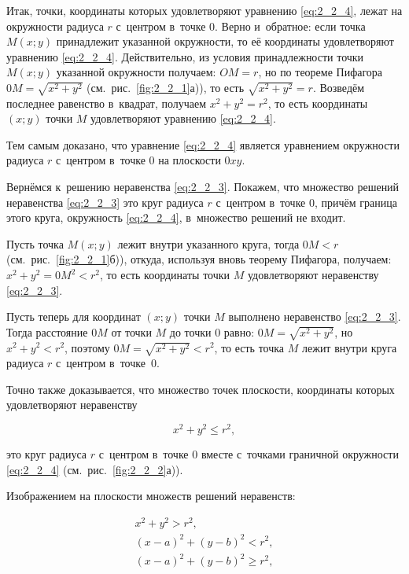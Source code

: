 Итак, точки, координаты которых удовлетворяют уравнению \eqref{eq:2_2_4},
лежат на окружности радиуса $r$ с~центром в~точке $0$.
Верно и~обратное: если точка $M(x; y)$ принадлежит указанной окружности,
то её координаты удовлетворяют уравнению \eqref{eq:2_2_4}.
Действительно, из условия принадлежности точки $M(x; y)$ указанной
окружности получаем: $OM = r$, но по теореме Пифагора
$0M = \sqrt{x^{2} + y^{2}}$ (см.\ рис.\ \ref{fig:2_2_1}а)), то есть
$\sqrt{x^{2} + y^{2}} = r$.
Возведём последнее равенство в~квадрат, получаем $x^{2} + y^{2} = r^{2}$,
то есть координаты $(x; y)$ точки $M$ удовлетворяют уравнению \eqref{eq:2_2_4}.

Тем самым доказано, что уравнение \eqref{eq:2_2_4} является уравнением окружности
радиуса $r$ с~центром в~точке 0 на плоскости $0xy$.

Вернёмся к~решению неравенства \eqref{eq:2_2_3}. Покажем, что множество решений
неравенства \eqref{eq:2_2_3} это круг радиуса $r$ с~центром в~точке $0$, причём
граница этого круга, окружность \eqref{eq:2_2_4}, в~множество решений не входит.

Пусть точка $M(x; y)$ лежит внутри указанного круга, тогда $0M < r$
(см.\ рис.\ \ref{fig:2_2_1}б)), откуда, используя вновь теорему Пифагора, получаем:
$x^{2} + y^{2} = 0M^{2} < r^{2}$, то есть координаты точки $M$ удовлетворяют
неравенству \eqref{eq:2_2_3}.

Пусть теперь для координат $(x; y)$ точки $M$ выполнено неравенство \eqref{eq:2_2_3}.
Тогда расстояние $0M$ от точки $M$ до точки 0 равно: $0M = \sqrt{x^{2} + y^{2}}$,
но $x^{2} + y^{2} < r^{2}$, поэтому $0M = \sqrt{x^{2} + y^{2}} < r^{2}$, то есть
точка $M$ лежит внутри круга радиуса $r$ с~центром в~точке~0.

Точно также доказывается, что множество точек плоскости, координаты которых
удовлетворяют неравенству

\begin{equation}\label{eq:2_2_5}
x^{2} + y^{2} \leqslant r^{2},
\end{equation}

\noindent
это круг радиуса $r$ с~центром в~точке 0 вместе с~точками граничной окружности
\eqref{eq:2_2_4} (см.\ рис.\ \ref{fig:2_2_2}а)).

Изображением на плоскости множеств решений неравенств:

\begin{gather}
x^{2} + y^{2} > r^{2}, \label{eq:2_2_6} \\
(x - a)^{2} + (y - b)^{2} < r^{2}, \label{eq:2_2_7} \\
(x - a)^{2} + (y - b)^{2} \geqslant r^{2}, \label{eq:2_2_8} 
\end{gather}
 
